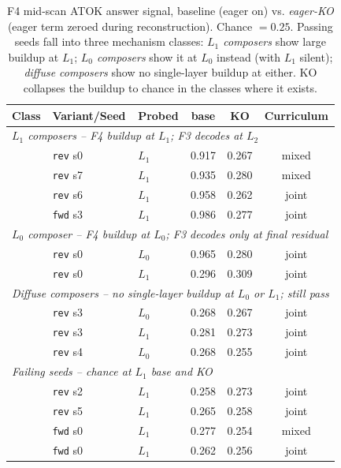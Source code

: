 \documentclass[11pt]{article}
\begin{document}
\begin{table}[h]
\centering
\caption{F4 mid-scan ATOK answer signal, baseline (eager on) vs.
\emph{eager-KO} (eager term zeroed during reconstruction). Chance
$= 0.25$. Passing seeds fall into three mechanism classes:
\emph{$L_1$ composers} show large buildup at $L_1$;
\emph{$L_0$ composers} show it at $L_0$ instead (with $L_1$ silent);
\emph{diffuse composers} show no single-layer buildup at either.
KO collapses the buildup to chance in the classes where it exists.}
\label{tab:f4-sweep}
\begin{tabular}{lllccc}
\toprule
Class & Variant/Seed & Probed & base & KO & Curriculum \\
\midrule
\multicolumn{6}{l}{\emph{$L_1$ composers -- F4 buildup at $L_1$; F3 decodes at $L_2$}} \\
                & \texttt{rev} s0 & $L_1$ & 0.917 & 0.267 & mixed \\
                & \texttt{rev} s7 & $L_1$ & 0.935 & 0.280 & mixed \\
                & \texttt{rev} s6 & $L_1$ & 0.958 & 0.262 & joint \\
                & \texttt{fwd} s3 & $L_1$ & 0.986 & 0.277 & joint \\
\midrule
\multicolumn{6}{l}{\emph{$L_0$ composer -- F4 buildup at $L_0$; F3 decodes only at final residual}} \\
                & \texttt{rev} s0 & $L_0$ & 0.965 & 0.280 & joint \\
                & \texttt{rev} s0 & $L_1$ & 0.296 & 0.309 & joint \\
\midrule
\multicolumn{6}{l}{\emph{Diffuse composers -- no single-layer buildup at $L_0$ or $L_1$; still pass}} \\
                & \texttt{rev} s3 & $L_0$ & 0.268 & 0.267 & joint \\
                & \texttt{rev} s3 & $L_1$ & 0.281 & 0.273 & joint \\
                & \texttt{rev} s4 & $L_0$ & 0.268 & 0.255 & joint \\
\midrule
\multicolumn{6}{l}{\emph{Failing seeds -- chance at $L_1$ base and KO}} \\
                & \texttt{rev} s2 & $L_1$ & 0.258 & 0.273 & joint \\
                & \texttt{rev} s5 & $L_1$ & 0.265 & 0.258 & joint \\
                & \texttt{fwd} s0 & $L_1$ & 0.277 & 0.254 & mixed \\
                & \texttt{fwd} s0 & $L_1$ & 0.262 & 0.256 & joint \\
\bottomrule
\end{tabular}
\end{table}
\end{document}
